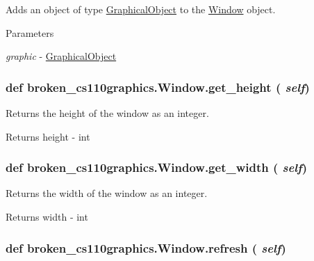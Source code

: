 Adds an object of type \hyperlink{classbroken__cs110graphics_1_1GraphicalObject}{GraphicalObject} to the \hyperlink{classbroken__cs110graphics_1_1Window}{Window} object. 
\begin{DoxyParams}{Parameters}
\item[{\em graphic}]-\/ \hyperlink{classbroken__cs110graphics_1_1GraphicalObject}{GraphicalObject} \end{DoxyParams}
\hypertarget{classbroken__cs110graphics_1_1Window_a2f751d4a6af7ace7dc4e1ad4d4da865c}{
\subsubsection[{get\_\-height}]{\setlength{\rightskip}{0pt plus 5cm}def broken\_\-cs110graphics.Window.get\_\-height ( {\em self})}}
\label{classbroken__cs110graphics_1_1Window_a2f751d4a6af7ace7dc4e1ad4d4da865c}


Returns the height of the window as an integer. \begin{DoxyReturn}{Returns}
height -\/ int 
\end{DoxyReturn}
\hypertarget{classbroken__cs110graphics_1_1Window_a39e0c2a0ae7a86cf92928a2a5c515b37}{
\subsubsection[{get\_\-width}]{\setlength{\rightskip}{0pt plus 5cm}def broken\_\-cs110graphics.Window.get\_\-width ( {\em self})}}
\label{classbroken__cs110graphics_1_1Window_a39e0c2a0ae7a86cf92928a2a5c515b37}


Returns the width of the window as an integer. \begin{DoxyReturn}{Returns}
width -\/ int 
\end{DoxyReturn}
\hypertarget{classbroken__cs110graphics_1_1Window_a6b54748e359110dad4a2397482ae429c}{
\subsubsection[{refresh}]{\setlength{\rightskip}{0pt plus 5cm}def broken\_\-cs110graphics.Window.refresh ( {\em self})}}
\label{classbroken__cs110graphics_1_1Window_a6b54748e359110dad4a2397482ae429c}


